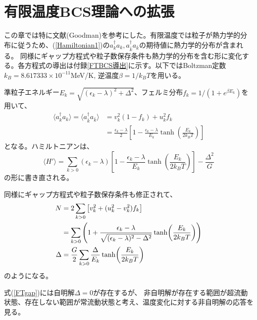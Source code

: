 \documentclass[a4paper,11pt]{jsreport}
\begin{document}
  \section{有限温度BCS理論への拡張}
  この章では特に文献(Goodman\cite{goodman1981finite})を参考にした。有限温度では粒子が熱力学的分布に従うため、(\ref{Hamiltonian1})の\(a^{\dagger}_ka_k,a^{\dagger}_{\bar{k}}a_{\bar{k}}\)の期待値に熱力学的分布が含まれる。
  同様にギャップ方程式や粒子数保存条件も熱力学的分布を含む形に変化する。各方程式の導出は付録\ref{FTBCS導出}に示す。以下ではBoltzman定数\(k_B=8.617333\times 10^{-11}\)MeV/K,
  逆温度\(\beta=1/k_B T\)を用いる。
  
  準粒子エネルギー\(E_k=\sqrt{(\epsilon_k-\lambda)^2+\Delta^2}\)、フェルミ分布\(f_k=1/(1+e^{\beta E_k})\)を用いて、
  \begin{align}
    \langle a^{\dagger}_ka_k \rangle =\langle a^{\dagger}_{\bar{k}}a_{\bar{k}}\rangle&=
    v_k^2(1-f_k)+u_k^2f_k\\
    &=\frac{\epsilon_k - \lambda}{2}\left[1-\frac{\epsilon_k-\lambda}{E_k}\tanh(\frac{E_k}{2k_B T})\right]
  \end{align}
  となる。ハミルトニアンは、
  \begin{equation}
    \langle H'\rangle=\sum_{k>0}(\epsilon_k - \lambda)\left[1-\frac{\epsilon_k-\lambda}{E_k}\tanh(\frac{E_k}{2k_B T})\right]-\frac{\Delta^2}{G}
  \end{equation}
  の形に書き直される。
  
  同様にギャップ方程式や粒子数保存条件も修正されて、
  \begin{align}
    N       &= 2\sum_{k>0}\left[v_k^2 + (u_k^2-v_k^2)f_k\right] \notag\\
            &= \sum_{k>0}\left(1+\frac{\epsilon_k-\lambda}{\sqrt{(\epsilon_k-\lambda)^2-\Delta^2}}\tanh(\frac{E_k}{2k_BT})\right)\\
    \Delta  &= \frac{G}{2}\sum_{k>0}\frac{\Delta}{E_k}\tanh(\frac{E_k}{2k_BT})\label{FTgap}
  \end{align}
  のようになる。

  式(\ref{FTgap})には自明解\(\Delta=0\)が存在するが、
  非自明解が存在する範囲が超流動状態、存在しない範囲が常流動状態と考え、温度変化に対する非自明解の応答を見る。
\end{document}
